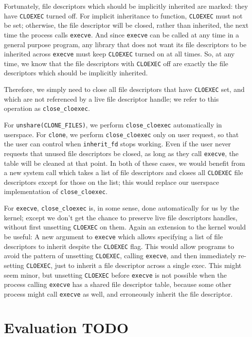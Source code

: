 \documentclass[letterpaper,twocolumn,10pt]{article}
\begin{document}
Fortunately, file descriptors which should be implicitly inherited are marked:
they have \texttt{CLOEXEC} turned off.
For implicit inheritance to function, \texttt{CLOEXEC} must not be set;
otherwise, the file descriptor will be closed, rather than inherited,
the next time the process calls \texttt{execve}.
And since \texttt{execve} can be called at any time in a general purpose program,
any library that does not want its file descriptors to be inherited across \texttt{execve}
must keep \texttt{CLOEXEC} turned on at all times.
So, at any time, we know that the file descriptors with \texttt{CLOEXEC} off
are exactly the file descriptors which should be implicitly inherited.

Therefore, we simply need to close all file descriptors that have \texttt{CLOEXEC} set,
and which are not referenced by a live file descriptor handle;
we refer to this operation as \verb|close_cloexec|.

For \verb|unshare(CLONE_FILES)|, we perform \verb|close_cloexec| automatically in userspace.
For \texttt{clone}, we perform \verb|close_cloexec| only on user request,
so that the user can control when \verb|inherit_fd| stops working.
Even if the user never requests that unused file descriptors be closed,
as long as they call \texttt{execve}, the table will be cleaned at that point.
In both of these cases,
we would benefit from a new system call which takes a list of file descriptors
and closes all \texttt{CLOEXEC} file descriptors except for those on the list;
this would replace our userspace implementation of \verb|close_cloexec|.

For \texttt{execve}, \verb|close_cloexec| is, in some sense, done automatically for us by the kernel;
except we don't get the chance to preserve live file descriptors handles,
without first unsetting \texttt{CLOEXEC} on them.
Again an extension to the kernel would be useful:
A new argument to \texttt{execve} which allows specifying a list of file descriptors to inherit
despite the \texttt{CLOEXEC} flag.
This would allow programs to avoid the pattern
of unsetting \texttt{CLOEXEC}, calling \texttt{execve}, and then immediately re-setting \texttt{CLOEXEC},
just to inherit a file descriptor across a single exec.
This might seem minor,
but unsetting \texttt{CLOEXEC} before \texttt{execve} is not possible
when the process calling \texttt{execve} has a shared file descriptor table,
because some other process might call \texttt{execve} as well,
and erroneously inherit the file descriptor.
\section{Evaluation \textbf{TODO}}\label{evaluation}
\end{document}
